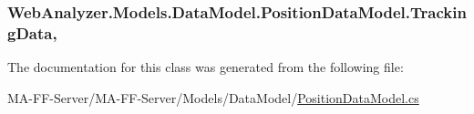 \subsubsection[{Tracking\+Data}]{ Web\+Analyzer.\+Models.\+Data\+Model.\+Position\+Data\+Model.\+Tracking\+Data\hspace{0.3cm}{\ttfamily [get]}, {\ttfamily [set]}}\label{class_web_analyzer_1_1_models_1_1_data_model_1_1_position_data_model_a1a065fa193e20137daa08472eefafd66}


The documentation for this class was generated from the following file\+:\begin{DoxyCompactItemize}
\item 
M\+A-\/\+F\+F-\/\+Server/\+M\+A-\/\+F\+F-\/\+Server/\+Models/\+Data\+Model/\hyperlink{_position_data_model_8cs}{Position\+Data\+Model.\+cs}\end{DoxyCompactItemize}
